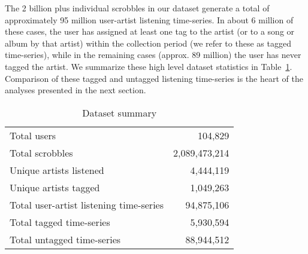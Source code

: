 The 2 billion plus individual scrobbles in our dataset generate a total of approximately 95 million user-artist listening time-series. In about 6 million of these cases, the user has assigned at least one tag to the artist (or to a song or album by that artist) within the collection period (we refer to these as tagged time-series), while in the remaining cases (approx. 89 million) the user has never tagged the artist. We summarize these high level dataset statistics in Table~\ref{tab:data_summary}. Comparison of these tagged and untagged listening time-series is the heart of the analyses presented in the next section.

\begin{table}[t]
\vspace{-1em}
\begin{center}
\begin{tabular}{l|r}
\toprule
Total users & 104,829 \\
Total scrobbles & 2,089,473,214 \\
Unique artists listened & 4,444,119 \\
Unique artists tagged & 1,049,263 \\
\midrule
Total user-artist listening time-series & 94,875,106 \\
Total tagged time-series & 5,930,594 \\
Total untagged time-series & 88,944,512 \\
\bottomrule
\end{tabular}
\end{center}

\caption{Dataset summary}
\label{tab:data_summary}
\vspace{-3em}
\end{table}

